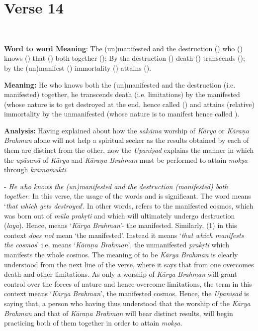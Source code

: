 \chapter{Verse 14}

\begin{moolashloka}
\\
\end{moolashloka}

\textbf{Word to word Meaning}: The (un)manifested and the destruction () who () knows () that () both together (); By the destruction () death () transcends (); by the (un)manifest () immortality () attains ().

\textbf{Meaning:} He who knows both the (un)manifested and the destruction (i.e. manifested) together, he transcends death (i.e. limitations) by the manifested (whose nature is to get destroyed at the end, hence called () and attains (relative) immortality by the unmanifested (whose nature is to manifest hence called ).

\textbf{Analysis:} Having explained about how the \emph{sakāma} worship of \emph{Kārya} or \emph{Kāraṇa Brahman} alone will not help a spiritual seeker as the results obtained by each of them are distinct from the other, now the \emph{Upaniṣad} explains the manner in which the \emph{upāsanā} of \emph{Kārya} and \emph{Kāraṇa Brahman} must be performed to attain \emph{mokṣa} through \emph{kramamukti}.

- \emph{He who knows the (un)manifested and the destruction (manifested) both together.} In this verse, the usage of the words  and  is significant. The word  means `\emph{that which gets destroyed}'. In other words,  refers to the manifested cosmos, which was born out of \emph{mūla prakṛti} and which will ultimately undergo destruction (\emph{laya}). Hence,  means `\emph{Kārya} \emph{Brahman'}- the manifested. Similarly,  (1) in this context \emph{does not} mean `the manifested'. Instead it means `\emph{that which manifests the cosmos}' i.e.  means `\emph{Kāraṇa Brahman}', the unmanifested \emph{prakṛti} which manifests the whole cosmos. The meaning of  to be \emph{Kārya} \emph{Brahman} is clearly understood from the next line of the verse, where it says that from  one overcomes death and other limitations. As only a worship of \emph{Kārya} \emph{Brahman} will grant control over the forces of nature and hence overcome limitations, the term  in this context means `\emph{Kārya} \emph{Brahman}', the manifested cosmos. Hence, the \emph{Upaniṣad} is saying that, a person who having thus understood that the worship of the \emph{Kārya} \emph{Brahman} and that of \emph{Kāraṇa Brahman} will bear distinct results, will begin practicing both of them together in order to attain \emph{mokṣa}.

